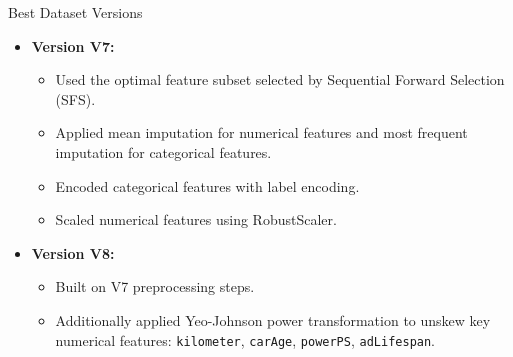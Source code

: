 \documentclass{beamer}
\begin{document}
\begin{frame}{Best Dataset Versions}
        \begin{itemize}
                \item \textbf{Version V7:}
                        \begin{itemize}
                                \item Used the optimal feature subset selected
                                        by Sequential Forward Selection (SFS).
                                \item Applied mean imputation for numerical
                                        features and most frequent imputation
                                        for categorical features.
                                \item Encoded categorical features with label
                                        encoding.
                                \item Scaled numerical features using
                                        RobustScaler.
                        \end{itemize}
                \item \textbf{Version V8:}
                        \begin{itemize}
                                \item Built on V7 preprocessing steps.
                                \item Additionally applied Yeo-Johnson power
                                        transformation to unskew key numerical
                                        features: \texttt{kilometer},
                                        \texttt{carAge}, \texttt{powerPS},
                                        \texttt{adLifespan}.
                        \end{itemize}
        \end{itemize}
\end{frame}
\end{document}
